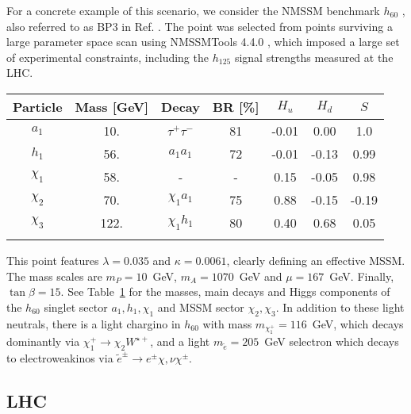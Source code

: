 \documentclass{ws-ijmpa}
\begin{document}
For a concrete example of this scenario, we consider the NMSSM benchmark $h_{60}$ \cite{refId0}, also referred to as BP3 in Ref. . The point was selected from points surviving a large parameter space scan using NMSSMTools 4.4.0 \cite{Ellwanger:2004xm,Ellwanger:2005dv,Belanger:2005kh,Ellwanger:2006rn,Das:2011dg,Muhlleitner:2003vg}, which imposed a large set of experimental constraints, including the $h_{125}$ signal strengths measured at the LHC. 

\begin{table}[h]
{\begin{tabular}{@{}ccccccc@{}} \toprule
Particle   & Mass [GeV] & Decay & BR [\%] & $H_u$ & $H_{d}$ & $S$  \\ \hline
$a_1$ & 10. & $\tau^+ \tau^-$ & 81 & -0.01 & 0.00 & 1.0  \\
$h_1$ & 56. & $a_1 a_1$ & 72 & -0.01 & -0.13 & 0.99  \\ 
$\chi_{1}$ & 58. & -  & - & 0.15 & -0.05 & 0.98 \\
$\chi_{2}$ & 70. & $\chi_{1} a_{1}$ & 75 & 0.88 & -0.15 & -0.19    \\
$\chi_{3}$ & 122.  & $\chi_{1} h_{1}$ & 80 & 0.40 & 0.68 & 0.05  \\ \botrule
\end{tabular}
\label{tab:h60}}
\end{table}

This point features $\lambda=0.035$ and $\kappa=0.0061$, clearly defining an effective MSSM. The mass scales are $m_{P}=10$~GeV, $m_{A}=1070$~GeV and $\mu=167$~GeV. Finally, $\tan \beta=15$. See Table~\ref{tab:h60} for the masses, main decays and Higgs components of the $h_{60}$ singlet sector $a_1,h_1,\chi_1$ and MSSM sector $\chi_2,\chi_3$. In addition to these light neutrals, there is a light chargino in $h_{60}$ with mass $m_{\chi_1^+}=116$~GeV, which decays dominantly via $\chi^{+}_{1} \rightarrow \chi_2 W^{\star +}$, and a light $m_{\tilde{e}}=205$~GeV selectron which decays to electroweakinos via $\tilde{e}^{\pm} \rightarrow e^{\pm} \chi, \nu \chi^{\pm}$.

\subsection{LHC}
\end{document}
